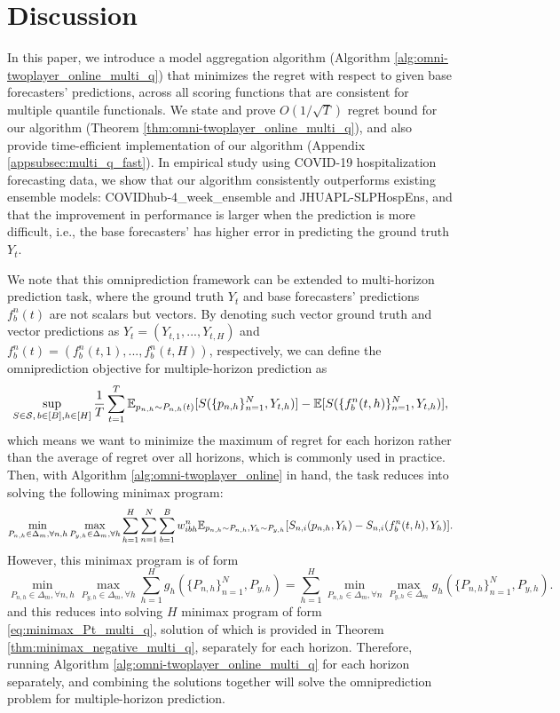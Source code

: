 \section{Discussion}
\label{sec:discussion}

In this paper, we introduce a model aggregation algorithm (Algorithm \ref{alg:omni-twoplayer_online_multi_q}) that minimizes the regret with respect to given base forecasters' predictions, across all scoring functions that are consistent for multiple quantile functionals. We state and prove $O(1/\sqrt{T})$ regret bound for our algorithm (Theorem \ref{thm:omni-twoplayer_online_multi_q}), and also provide time-efficient implementation of our algorithm (Appendix \ref{appsubsec:multi_q_fast}). In empirical study using COVID-19 hospitalization forecasting data, we show that our algorithm consistently outperforms existing ensemble models: COVIDhub-4\_week\_ensemble and JHUAPL-SLPHospEns, and that the improvement in performance is larger when the prediction is more difficult, i.e., the base forecasters' has higher error in predicting the ground truth $Y_t$. 

We note that this omniprediction framework can be extended to multi-horizon prediction task, where the ground truth $Y_t$ and base forecasters' predictions $f_b^n(t)$ are not scalars but vectors. By denoting such vector ground truth and vector predictions as $Y_t = (Y_{t,1}, ..., Y_{t,H})$ and $f_b^n(t) = (f_b^n(t,1), ..., f_b^n(t,H))$, respectively, we can define the omniprediction objective for multiple-horizon prediction as
\[
\sup_{S \in \mathcal{S},\, b \in [B], h \in [H]} \frac{1}{T} \sum_{t=1}^T \mathbb{E}_{p_{n,h} \sim P_{n,h}(t)} [S(\{p_{n,h}\}_{n=1}^N, Y_{t,h})] - \mathbb{E}[S(\{f_b^n(t,h)\}_{n=1}^N, Y_{t,h})],
\]
which means we want to minimize the maximum of regret for each horizon rather than the average of regret over all horizons, which is commonly used in practice. Then, with Algorithm \ref{alg:omni-twoplayer_online} in hand, the task reduces into solving the following minimax program:
\begin{align*}
    \min_{P_{n,h} \in \Delta_m, \forall n,h} \max_{P_{y,h} \in \Delta_m, \forall h} \sum_{h=1}^H  \sum_{n=1}^N \sum_{b=1}^B  w_{ibh}^n \mathbb{E}_{p_{n,h} \sim P_{n,h}, Y_h \sim P_{y,h}}[S_{n,i}(p_{n,h}, Y_h) - S_{n,i}(f_b^n(t,h), Y_h)].
\end{align*}
However, this minimax program is of form 
\[
    \min_{P_{n,h} \in \Delta_m, \forall n,h} \max_{P_{y,h} \in \Delta_m, \forall h} \sum_{h=1}^H g_h(\{P_{n,h}\}_{n=1}^N, P_{y,h}) 
    = \sum_{h=1}^H \min_{P_{n,h} \in \Delta_m, \forall n} \max_{P_{y,h} \in \Delta_m} g_h(\{P_{n,h}\}_{n=1}^N, P_{y,h}).
\]
and this reduces into solving $H$ minimax program of form \eqref{eq:minimax_Pt_multi_q}, solution of which is provided in Theorem \ref{thm:minimax_negative_multi_q}, separately for each horizon. Therefore, running Algorithm \ref{alg:omni-twoplayer_online_multi_q} for each horizon separately, and combining the solutions together will solve the omniprediction problem for multiple-horizon prediction.
